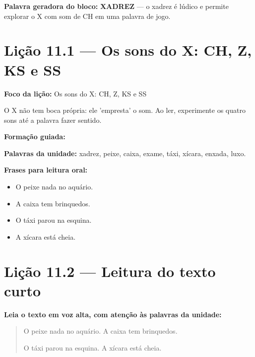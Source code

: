 \textbf{Palavra geradora do bloco:} \textbf{XADREZ} --- o xadrez é lúdico e permite explorar o X com som de CH em uma palavra de jogo.

\section{Lição 11.1 --- Os sons do X: CH, Z, KS e SS}

\textbf{Foco da lição:} Os sons do X: CH, Z, KS e SS


\begin{boquinha}
O X não tem boca própria: ele 'empresta' o som. Ao ler, experimente os quatro sons até a palavra fazer sentido.
\end{boquinha}

\noindent\textbf{Formação guiada:}

\begin{center}
\end{center}

\noindent\textbf{Palavras da unidade:} xadrez, peixe, caixa, exame, táxi, xícara, enxada, luxo.

\noindent\textbf{Frases para leitura oral:}
\begin{itemize}[leftmargin=1.6em]
  \item O peixe nada no aquário.
  \item A caixa tem brinquedos.
  \item O táxi parou na esquina.
  \item A xícara está cheia.
\end{itemize}

\section{Lição 11.2 --- Leitura do texto curto}

\noindent\textbf{Leia o texto em voz alta, com atenção às palavras da unidade:}


\begin{quote}
O peixe nada no aquário. A caixa tem brinquedos.

O táxi parou na esquina. A xícara está cheia.
\end{quote}

